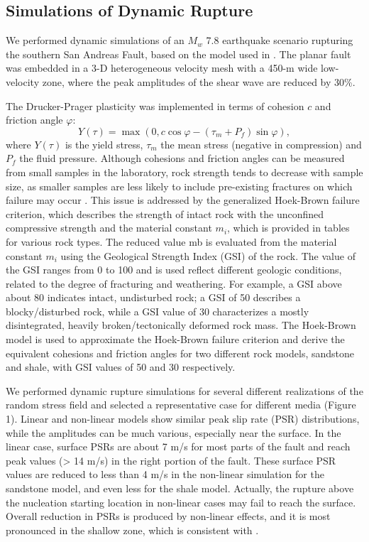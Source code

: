 \subsection{Simulations of Dynamic Rupture}
We performed dynamic simulations of an $M_w$ 7.8 earthquake scenario rupturing the southern San Andreas Fault, based on the model used in \citet{rotenOfffaultDeformationsShallow2017}. The planar fault was embedded in a 3-D heterogeneous velocity mesh \citep[SCEC CVM4;][]{magistraleSCECSouthernCalifornia2000} with a 450-m wide low-velocity zone, where the peak amplitudes of the shear wave are reduced by 30\%.

The Drucker-Prager plasticity was implemented in terms of cohesion $c$ and friction angle $\varphi$:
\begin{equation}\label{eq:eks-1}
    Y(\tau)=\max \left(0, c \cos \varphi-\left(\tau_{m}+P_{f}\right) \sin \varphi\right),
\end{equation}
where $Y(\tau)$ is the yield stress, $\tau_{m}$ the mean stress (negative in compression) and $P_f$ the fluid pressure. Although cohesions and friction angles can be measured from small samples in the laboratory, rock strength tends to decrease with sample size, as smaller samples are less likely to include pre-existing fractures on which failure may occur \citep{wyllie2017rock}. This issue is addressed by the generalized Hoek-Brown failure criterion, which describes the strength of intact rock with the unconfined compressive strength and the material constant $m_i$, which is provided in tables for various rock types. The reduced value mb is evaluated from the material constant $m_i$ using the Geological Strength Index (GSI) of the rock\citep{hoek1980empirical,hoek1997practical}. The value of the GSI ranges from 0 to 100 and is used reflect different geologic conditions, related to the degree of fracturing and weathering. For example, a GSI above about 80 indicates intact, undisturbed rock; a GSI of 50 describes a blocky/disturbed rock, while a GSI value of 30 characterizes a mostly disintegrated, heavily broken/tectonically deformed rock mass. The Hoek-Brown model \citep{evert2002hoek} is used to approximate the Hoek-Brown failure criterion and derive the equivalent cohesions and friction angles for two different rock models, sandstone and shale, with GSI values of 50 and 30 respectively.


We performed dynamic rupture simulations for several different realizations of the random stress field and selected a representative case for different media (Figure 1). Linear and non-linear models show similar peak slip rate (PSR) distributions, while the amplitudes can be much various, especially near the surface. In the linear case, surface PSRs are about 7 m/s for most parts of the fault and reach peak values (> 14 m/s) in the right portion of the fault. These surface PSR values are reduced to less than 4 m/s in the non-linear simulation for the sandstone model, and even less for the shale model. Actually, the rupture above the nucleation starting location in non-linear cases may fail to reach the surface. Overall reduction in PSRs is produced by non-linear effects, and it is most pronounced in the shallow zone, which is consistent with \citet{rotenExpectedSeismicShaking2014}.

